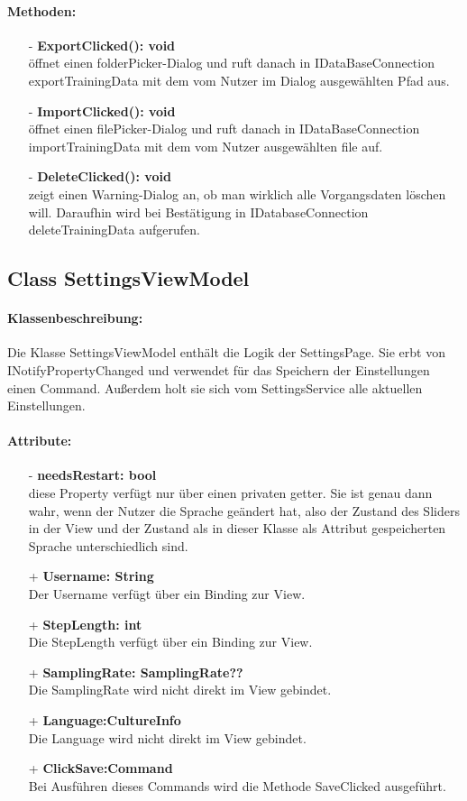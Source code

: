 \documentclass[a4paper,12pt]{article}
\begin{document}
\paragraph{Methoden:}
\begin{itemize}
    \item[-] \textbf{ExportClicked(): void}\\ öffnet einen folderPicker-Dialog und ruft danach in IDataBaseConnection exportTrainingData mit dem vom Nutzer im Dialog ausgewählten Pfad aus.%
    \item[-] \textbf{ImportClicked(): void}\\ öffnet einen filePicker-Dialog und ruft danach in IDataBaseConnection importTrainingData mit dem vom Nutzer ausgewählten file auf.
    \item[-] \textbf{DeleteClicked(): void}\\zeigt einen Warning-Dialog an, ob man wirklich alle Vorgangsdaten löschen will. Daraufhin wird bei Bestätigung in IDatabaseConnection deleteTrainingData aufgerufen.
\end{itemize} 

\subsection{Class SettingsViewModel}

\paragraph{Klassenbeschreibung:}
Die Klasse SettingsViewModel enthält die Logik der SettingsPage. Sie erbt von INotifyPropertyChanged und verwendet für das Speichern der Einstellungen einen Command. Außerdem holt sie sich vom SettingsService alle aktuellen Einstellungen.
\paragraph{Attribute:}
\begin{itemize}
	\item[-] \textbf{needsRestart: bool}\\ diese Property verfügt nur über einen privaten getter. Sie ist genau dann wahr, wenn der Nutzer die Sprache geändert hat, also der Zustand des Sliders in der View und der Zustand als in dieser Klasse als Attribut gespeicherten Sprache unterschiedlich sind.
	\item[+] \textbf{Username: String}\\Der Username verfügt über ein Binding zur View.
	\item[+] \textbf{StepLength: int}\\Die StepLength verfügt über ein Binding zur View. 
	\item[+] \textbf{SamplingRate: SamplingRate??}\\Die SamplingRate wird nicht direkt im View gebindet.
	\item[+] \textbf{Language:CultureInfo}\\Die Language wird nicht direkt im View gebindet. 
	\item[+] \textbf{ClickSave:Command}\\Bei Ausführen dieses Commands wird die Methode SaveClicked ausgeführt. 
\end{itemize}
\end{document}
